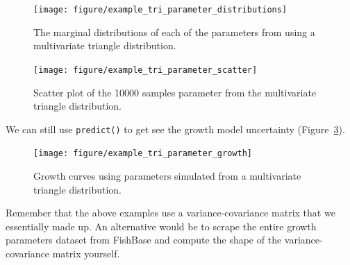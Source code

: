 \documentclass[a4paper,english,10pt]{article}\usepackage[]{graphicx}\usepackage[]{color}
\newenvironment{knitrout}{}{} %
\newcommand{\code}[1]{{\texttt{#1}}}
\begin{document}
\begin{figure}[h]
\begin{knitrout}
\color{fgcolor}

{\centering \texttt{[image: figure/example\_tri\_parameter\_distributions]} 

}



\end{knitrout}

\caption{The marginal distributions of each of the parameters from using a multivariate triangle distribution.}
\label{fig:plot_tri_params}
\end{figure}


\begin{figure}[h]
\begin{knitrout}
\color{fgcolor}

{\centering \texttt{[image: figure/example\_tri\_parameter\_scatter]} 

}



\end{knitrout}

\caption{Scatter plot of the 10000 samples parameter from the multivariate triangle distribution.}
\label{fig:plot_tri_scatter}
\end{figure}

We can still use \code{predict()} to get see the growth model uncertainty (Figure~\ref{fig:plot_tri_growth}).




\begin{figure}[h]
\begin{knitrout}
\color{fgcolor}

{\centering \texttt{[image: figure/example\_tri\_parameter\_growth]} 

}



\end{knitrout}

\caption{Growth curves using parameters simulated from a multivariate triangle distribution.}
\label{fig:plot_tri_growth}
\end{figure}

Remember that the above examples use a variance-covariance matrix that we essentially made up.
An alternative would be to scrape the entire growth parameters dataset from FishBase and compute the shape of the variance-covariance matrix yourself.
\end{document}
